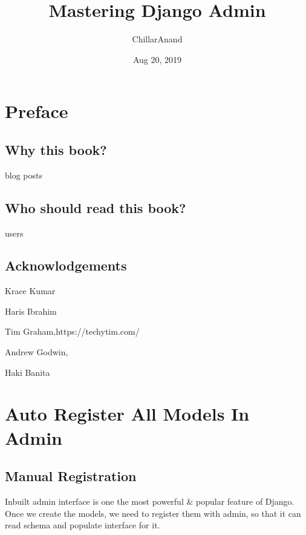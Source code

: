 \documentclass[letterpaper,12pt,english]{sphinxmanual}
\title{Mastering Django Admin}
\date{Aug 20, 2019}
\author{ChillarAnand}
\begin{document}
\pagestyle{empty}
\sphinxmaketitle
\pagestyle{plain}
\sphinxtableofcontents
\pagestyle{normal}
\label{\detokenize{index::doc}}



\chapter{Preface}
\label{\detokenize{preface:preface}}\label{\detokenize{preface::doc}}

\section{Why this book?}
\label{\detokenize{preface:why-this-book}}
blog posts


\section{Who should read this book?}
\label{\detokenize{preface:who-should-read-this-book}}
users


\section{Acknowlodgements}
\label{\detokenize{preface:acknowlodgements}}
Krace Kumar

Haris Ibrahim

Tim Graham,https://techytim.com/

Andrew Godwin, 

Haki Banita



\chapter{Auto Register All Models In Admin}
\label{\detokenize{admin_auto_register_models:auto-register-all-models-in-admin}}\label{\detokenize{admin_auto_register_models::doc}}

\section{Manual Registration}
\label{\detokenize{admin_auto_register_models:manual-registration}}
Inbuilt admin interface is one the most powerful \& popular feature of Django. Once we create the models, we need to register them with admin, so that it can read schema and populate interface for it.
\end{document}
